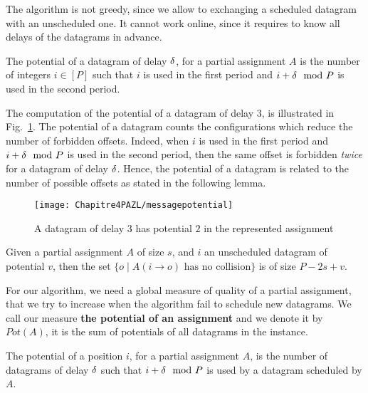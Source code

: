 The algorithm is not greedy, since we allow to exchanging a scheduled datagram with an unscheduled one. It cannot work online, since it requires to know all delays of the datagrams in advance. 

\begin{definition}
The potential of a datagram of delay $\delta$, for a partial assignment $A$
is the number of integers $i \in [P]$ such that $i$ is used in the first period and $i+\delta \mod P$ is used in the second period.
\end{definition}

The computation of the potential of a datagram of delay $3$, is illustrated in Fig.~\ref{fig:datagrampotential}.
The potential of a datagram counts the configurations which reduce the number of forbidden offsets.
Indeed, when $i$ is used in the first period and $i+\delta \mod P$ is used in the second period,
then the same offset is forbidden \emph{twice} for a datagram of delay $\delta$. Hence, the potential of a datagram is related to the number of possible offsets as stated in the following lemma. 
\begin{figure}
 \begin{center}
\texttt{[image: Chapitre4PAZL/messagepotential]}
\end{center}
\caption{A datagram of delay $3$ has potential $2$ in the represented assignment}
\label{fig:datagrampotential}
\end{figure} 

\begin{lemma}
Given a partial assignment $A$ of size $s$, and $i$ an unscheduled datagram of potential 
$v$, then the set $\{o \mid A(i \rightarrow o) \text{ has no collision}\}$ is of size $P - 2s + v$.
\end{lemma}

For our algorithm, we need a global measure of quality of a partial assignment, 
that we try to increase when the algorithm fail to schedule new datagrams. 
We call our measure \textbf{the potential of an assignment} and we denote it by $Pot(A)$, it is the sum of potentials of all datagrams in the instance.


\begin{definition}
The potential of a position $i$, for a partial assignment $A$, is the number of datagrams of delay $\delta$ such that $i+\delta \mod P$ is used by a datagram scheduled by $A$. 
\end{definition}

